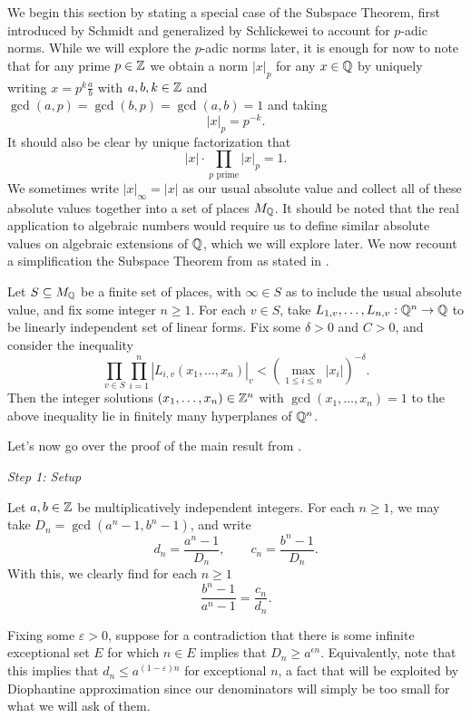 We begin this section by stating a special case of the Subspace Theorem,
first introduced by Schmidt and generalized by Schlickewei to account for $p$-adic norms.
While we will explore the $p$-adic norms later, 
it is enough for now to note that for any prime $p \in \mathbb{Z}$ we obtain a norm
$|x|_p$ for any $x \in \mathbb{Q}$ by uniquely writing $x = p^k \frac{a}{b}$ with $a, b, k \in \mathbb{Z}$ and $\gcd(a, p) = \gcd(b, p) = \gcd(a, b) = 1$ and taking
\[
    |x|_p = p^{-k}.
\]
It should also be clear by unique factorization that
\[
    |x| \cdot \prod_{p \text{ prime}} |x|_p = 1.
\]
We sometimes write $|x|_\infty = |x|$ as our usual absolute value and collect all of these absolute values together into a set of places $M_{\mathbb{Q}}$.
It should be noted that the real application to algebraic numbers would require us to define similar absolute values on algebraic extensions of $\mathbb{Q}$,
which we will explore later.
We now recount a simplification the Subspace Theorem from \cite{Schlickewei_1977} as stated in \cite{BCZ_2002}.


\begin{theorem}
    Let $S \subseteq M_{\mathbb{Q}}$ be a finite set of places, 
    with $\infty \in S$ as to include the usual absolute value,
    and fix some integer $n \geq 1$.
    For each $v \in S$, take $L_{1,v}, \ldots, L_{n, v} : \mathbb{Q}^n \to \mathbb{Q}$ to be linearly independent set of linear forms.
    Fix some $\delta > 0$ and $C > 0$, 
    and consider the inequality
    \[
        \prod_{v \in S}\prod_{i = 1}^n |L_{i,v}(x_1, \ldots, x_n)|_v < (\max_{1 \leq i \leq n} |x_i|)^{-\delta}.
    \]
    Then the integer solutions $(x_1, \ldots, x_n) \in \mathbb{Z}^n$ with $\gcd(x_1, \ldots, x_n) = 1$ to the above inequality lie in finitely many hyperplanes of $\mathbb{Q}^n$.
\end{theorem}

Let's now go over the proof of the main result from \cite{BCZ_2002}.

\noindent\textit{Step 1: Setup}

Let $a, b \in \mathbb{Z}$ be multiplicatively independent integers. 
For each $n \geq 1$, we may take $D_n = \gcd(a^n - 1, b^n - 1)$,
and write
\[
    d_n = \frac{a^n - 1}{D_n}, \qquad 
    c_n = \frac{b^n - 1}{D_n}.
\]
With this, we clearly find for each $n \geq 1$
\[
    \frac{b^n - 1}{a^n - 1}
    = \frac{c_n}{d_n}.
\]

Fixing some $\varepsilon > 0$,
suppose for a contradiction that there is some infinite exceptional set $E$ for which $n \in E$ implies that $D_n \geq a^{\epsilon n}$.
Equivalently, note that this implies that $d_n \leq a^{(1 - \varepsilon)n}$ for exceptional $n$,
a fact that will be exploited by Diophantine approximation since our denominators will simply be too small for what we will ask of them. 

